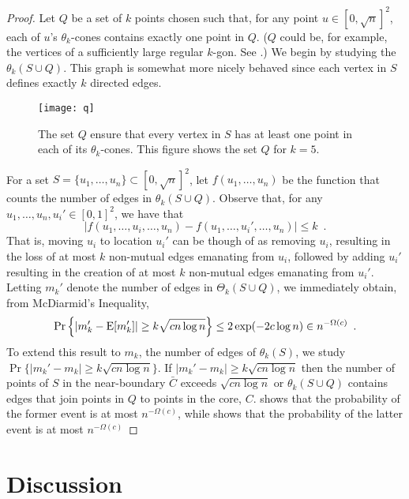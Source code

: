 \documentclass{patmorin}
\begin{document}
\begin{proof}
Let $Q$ be a set of $k$ points chosen such that, for any point
$u\in[0,\sqrt{n}]^2$, each of $u$'s $\theta_k$-cones contains exactly one
point in $Q$. ($Q$ could be, for example, the vertices of a sufficiently
large regular $k$-gon. See .)  We begin by studying the
$\theta_k(S\cup Q)$.  This graph is somewhat more nicely behaved since
each vertex in $S$ defines exactly $k$ directed edges.

\begin{figure}
  \begin{center}
    \texttt{[image: q]}
  \end{center}
  \caption{The set $Q$ ensure that every vertex in $S$ has at least
    one point in each of its $\theta_k$-cones.  This figure shows the
    set $Q$ for $k=5$.}
\end{figure}

For a set $S=\{u_1,\ldots,u_n\}\subset [0,\sqrt{n}]^2$,
let $f(u_1,\ldots,u_n)$ be the function that counts the number of edges
in $\theta_k(S\cup Q)$.  Observe that, for any $u_1,\ldots,u_n,u_i'\in
[0,1]^2$, we have that
\[
   |f(u_1,\ldots,u_i,\ldots,u_n)-f(u_1,\ldots,u_i',\ldots,u_n)| \le k \enspace .
\]
That is, moving $u_i$ to location $u_i'$ can be though of as removing
$u_i$, resulting in the loss of at most $k$ non-mutual edges emanating
from $u_i$, followed by adding $u_i'$ resulting in the creation of at
most $k$ non-mutual edges emanating from $u_i'$.  Letting $m_k'$ denote
the number of edges in $\Theta_k(S\cup Q)$, we immediately obtain,
from McDiarmid's Inequality,
\[
   \Pr\left\{\left|m_k'-\mathrm{E}[m_k']\right| \ge k\sqrt{cn\log n}\right\} 
       \le 2\exp(-2c\log n) 
       \in n^{-\Omega(c)} \enspace .
\]
To extend this result to $m_k$, the number of edges of $\theta_k(S)$,
we study $\Pr\{|m_k' - m_k|\ge k\sqrt{cn\log n}\}$.  If $|m_k' - m_k|\ge
k\sqrt{cn\log n}$ then the number of points of $S$ in the near-boundary
$\bar{C}$ exceeds $\sqrt{cn\log n}$ or $\theta_k(S\cup Q)$ contains
edges that join points in $Q$ to points in the core, $C$.
 shows that the probability of the former event is at most
$n^{-\Omega(c)}$, while  shows that the probability of
the latter event is at most $n^{-\Omega(c)}$
\end{proof}





\section{Discussion}
\end{document}
